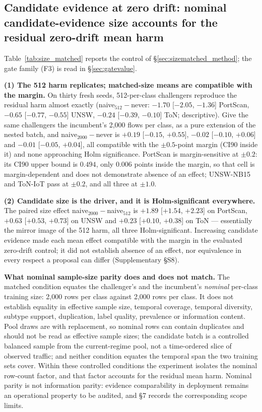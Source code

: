 \documentclass[a4paper,fleqn]{cas-sc}
\begin{document}
\subsection{Candidate evidence at zero drift: nominal candidate-evidence size accounts for the residual zero-drift mean harm}
\label{sec:sizematched}

Table~\ref{tab:size_matched} reports the control of \S\ref{sec:sizematched_method}; the gate family (F3) is read in \S\ref{sec:gatevalue}.

\textbf{(1) The 512 harm replicates; matched-size means are compatible with the margin.} On thirty fresh seeds, 512-per-class challengers reproduce the residual harm almost exactly (naive$_{512}-$never: $-1.70$ [$-2.05$, $-1.36$] PortScan, $-0.65$ [$-0.77$, $-0.55$] UNSW, $-0.24$ [$-0.39$, $-0.10$] ToN; descriptive). Give the same challengers the incumbent's 2{,}000 flows per class, as a pure extension of the nested batch, and naive$_{2000}-$never is $+0.19$ [$-0.15$, $+0.55$], $-0.02$ [$-0.10$, $+0.06$] and $-0.01$ [$-0.05$, $+0.04$], all compatible with the $\pm0.5$-point margin (CI90 inside it) and none approaching Holm significance. PortScan is margin-sensitive at $\pm0.2$: its CI90 upper bound is $0.494$, only $0.006$ points inside the margin, so that cell is margin-dependent and does not demonstrate absence of an effect; UNSW-NB15 and ToN-IoT pass at $\pm0.2$, and all three at $\pm1.0$.


\textbf{(2) Candidate size is the driver, and it is Holm-significant everywhere.} The paired size effect naive$_{2000}-$naive$_{512}$ is $+1.89$ [$+1.54$, $+2.23$] on PortScan, $+0.63$ [$+0.53$, $+0.73$] on UNSW and $+0.23$ [$+0.10$, $+0.38$] on ToN --- essentially the mirror image of the 512 harm, all three Holm-significant. Increasing candidate evidence made each mean effect compatible with the margin in the evaluated zero-drift control; it did not establish absence of an effect, nor equivalence in every respect a proposal can differ (Supplementary \S S8).

\textbf{What nominal sample-size parity does and does not match.} The matched condition equates the challenger's and the incumbent's \emph{nominal} per-class training size: 2{,}000 rows per class against 2{,}000 rows per class. It does not establish equality in effective sample size, temporal coverage, temporal diversity, subtype support, duplication, label quality, prevalence or information content. Pool draws are with replacement, so nominal rows can contain duplicates and should not be read as effective sample sizes; the candidate batch is a controlled balanced sample from the current-regime pool, not a time-ordered slice of observed traffic; and neither condition equates the temporal span the two training sets cover. Within these controlled conditions the experiment isolates the nominal row-count factor, and that factor accounts for the residual mean harm. Nominal parity is not information parity: evidence comparability in deployment remains an operational property to be audited, and \S7 records the corresponding scope limits.
\end{document}
